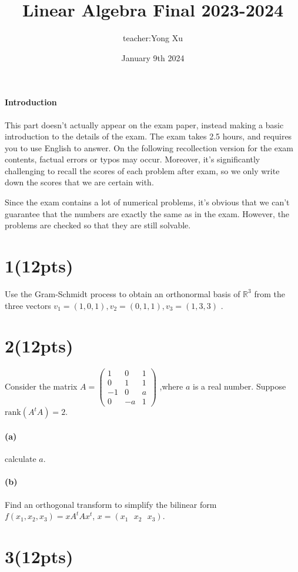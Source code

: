 \documentclass{article}
\title{Linear Algebra Final 2023-2024}
\author{teacher:Yong Xu}
\date{January 9th 2024}
\begin{document}
\maketitle
\paragraph{Introduction}
This part doesn't actually appear on the exam paper, instead making a basic introduction to the details of the exam. The exam takes 2.5 hours, and requires you to use English to answer. On the following recollection version for the exam contents, factual errors or typos may occur. Moreover, it's significantly challenging to recall the scores of each problem after exam, so we only write down the scores that we are certain with.

Since the exam contains a lot of numerical problems, it's obvious that we can't guarantee that the numbers are exactly the same as in the exam. However, the problems are checked so that they are still solvable.

\section*{1(12pts)}
Use the Gram-Schmidt process to obtain an orthonormal basis of $\mathbb{R}^3$ from the three vectors $v_1=(1,0,1),v_2=(0,1,1),v_3=(1,3,3)$ .

\section*{2(12pts)}
Consider the matrix $A=\begin{pmatrix}
    1 & 0 & 1 \\ 0 & 1 & 1 \\ -1 & 0 & a \\ 0 & -a & 1
\end{pmatrix}$ ,where  $a$ is a real number. Suppose $\text{rank}(A^tA)=2$.

\paragraph{(a)} calculate $a$.
\paragraph{(b)} Find an orthogonal transform to simplify the bilinear form $f(x_1,x_2,x_3)=xA^tAx^t$, $x=(x_1\text{ } x_2 \text{ }x_3)$.

\section*{3(12pts)}
\end{document}
